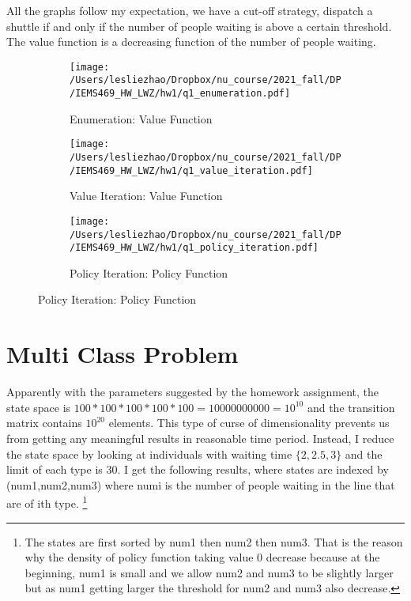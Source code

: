 \documentclass[12pt,letterpaper]{article}
\begin{document}
All the graphs follow my expectation, we have a cut-off strategy, dispatch a shuttle if and only if the number of people waiting is above a certain threshold. The value function is a decreasing function of the number of people waiting. 
\begin{figure}[H]
	\centering
	\caption{Single Class Problem}
	\begin{subfigure}[h]{0.48\textwidth}
		\centering
		\texttt{[image: /Users/lesliezhao/Dropbox/nu\_course/2021\_fall/DP/IEMS469\_HW\_LWZ/hw1/q1\_enumeration.pdf]}
		\caption{Enumeration: Value Function}
	\end{subfigure}
	\begin{subfigure}[h]{0.48\textwidth}
		\centering
		\texttt{[image: /Users/lesliezhao/Dropbox/nu\_course/2021\_fall/DP/IEMS469\_HW\_LWZ/hw1/q1\_value\_iteration.pdf]}
		\caption{Value Iteration: Value Function}
	\end{subfigure}
	\begin{subfigure}[h]{0.48\textwidth}
		\centering
		\texttt{[image: /Users/lesliezhao/Dropbox/nu\_course/2021\_fall/DP/IEMS469\_HW\_LWZ/hw1/q1\_policy\_iteration.pdf]}
		\caption{Policy Iteration: Policy Function}
	\end{subfigure}
	\label{votemap}
\end{figure}

\section{Multi Class Problem}
Apparently with the parameters suggested by the homework assignment, the state space is $100*100*100*100*100=10000000000=10^{10}$ and the transition matrix contains $10^{20}$ elements. This type of curse of dimensionality prevents us from getting any meaningful results in  reasonable time period. Instead, I reduce the state space by looking at individuals with waiting time $\{2,2.5,3\}$ and the limit of each type is 30. I get the following results, where states are indexed by (num1,num2,num3) where numi is the number of people waiting in the line that are of ith type. \footnote{The states are first sorted by num1 then num2 then num3. That is the reason why the density of policy function taking value 0 decrease because at the beginning, num1 is small and we allow num2 and num3 to be slightly larger but as num1 getting larger the threshold for num2 and num3 also decrease.} \\
\end{document}
